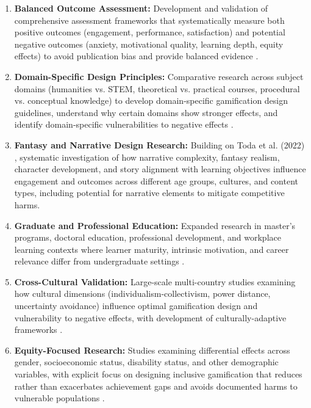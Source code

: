 \documentclass[12pt,a4paper]{article}
\begin{document}
\begin{enumerate}
    \item \textbf{Balanced Outcome Assessment:} Development and validation of comprehensive assessment frameworks that systematically measure both positive outcomes (engagement, performance, satisfaction) and potential negative outcomes (anxiety, motivational quality, learning depth, equity effects) to avoid publication bias and provide balanced evidence \parencite{surendeleg2024}.
    
    \item \textbf{Domain-Specific Design Principles:} Comparative research across subject domains (humanities vs. STEM, theoretical vs. practical courses, procedural vs. conceptual knowledge) to develop domain-specific gamification design guidelines, understand why certain domains show stronger effects, and identify domain-specific vulnerabilities to negative effects \parencite{wu2024,dahri2024}.
    
    \item \textbf{Fantasy and Narrative Design Research:} Building on Toda et al. (2022) \parencite{toda2022}, systematic investigation of how narrative complexity, fantasy realism, character development, and story alignment with learning objectives influence engagement and outcomes across different age groups, cultures, and content types, including potential for narrative elements to mitigate competitive harms.
    
    \item \textbf{Graduate and Professional Education:} Expanded research in master's programs, doctoral education, professional development, and workplace learning contexts where learner maturity, intrinsic motivation, and career relevance differ from undergraduate settings \parencite{sevilla2024}.
    
    \item \textbf{Cross-Cultural Validation:} Large-scale multi-country studies examining how cultural dimensions (individualism-collectivism, power distance, uncertainty avoidance) influence optimal gamification design and vulnerability to negative effects, with development of culturally-adaptive frameworks \parencite{dahri2024,ojonuba2023,sevilla2024,toda2022}.
    
    \item \textbf{Equity-Focused Research:} Studies examining differential effects across gender, socioeconomic status, disability status, and other demographic variables, with explicit focus on designing inclusive gamification that reduces rather than exacerbates achievement gaps and avoids documented harms to vulnerable populations \parencite{surendeleg2024}.
    

\end{enumerate}
\end{document}
